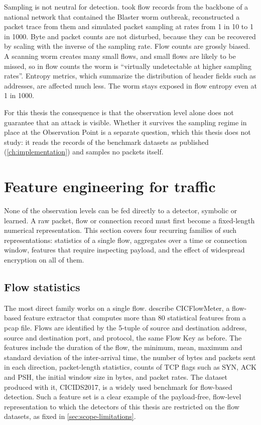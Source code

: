 Sampling is not neutral for detection. \citet{brauckhoff2006samplingimpact}
took flow records from the backbone of a national network that contained
the Blaster worm outbreak, reconstructed a packet trace from them and
simulated packet sampling at rates from 1 in 10 to 1 in 1000. Byte and
packet counts are not disturbed, because they can be recovered by scaling
with the inverse of the sampling rate. Flow counts are grossly biased. A
scanning worm creates many small flows, and small flows are likely to be
missed, so in flow counts the worm is ``virtually undetectable at higher
sampling rates''. Entropy metrics, which summarize the distribution of
header fields such as addresses, are affected much less. The worm stays
exposed in flow entropy even at 1 in 1000.

For this thesis the consequence is that the observation level alone does not
guarantee that an attack is visible. Whether it survives the sampling regime
in place at the Observation Point is a separate question, which this thesis
does not study: it reads the records of the benchmark datasets as published
(\cref{ch:implementation}) and samples no packets itself.

\section{Feature engineering for traffic}
\label{sec:feature-engineering-traffic}

None of the observation levels can be fed directly to a detector, symbolic or
learned. A raw packet, flow or connection record must first become a
fixed-length numerical representation. This section covers four recurring
families of such representations: statistics of a single flow, aggregates
over a time or connection window, features that require inspecting payload,
and the effect of widespread encryption on all of them.

\subsection{Flow statistics}
\label{sec:flow-statistics-cicflowmeter}

The most direct family works on a single flow. \citet{sharafaldin2018cicids2017}
describe CICFlowMeter, a flow-based feature extractor that computes more than
80 statistical features from a pcap file. Flows are identified by the
5-tuple of source and destination address, source and destination port, and
protocol, the same Flow Key as before. The features include the duration of
the flow, the minimum, mean, maximum and standard deviation of the
inter-arrival time, the number of bytes and packets sent in each direction,
packet-length statistics, counts of TCP flags such as SYN, ACK and PSH, the
initial window size in bytes, and packet rates. The dataset produced with
it, CICIDS2017, is a widely used benchmark for flow-based detection. Such a
feature set is a clear example of the payload-free, flow-level
representation to which the detectors of this thesis are restricted on the
flow datasets, as fixed in \cref{sec:scope-limitations}.

